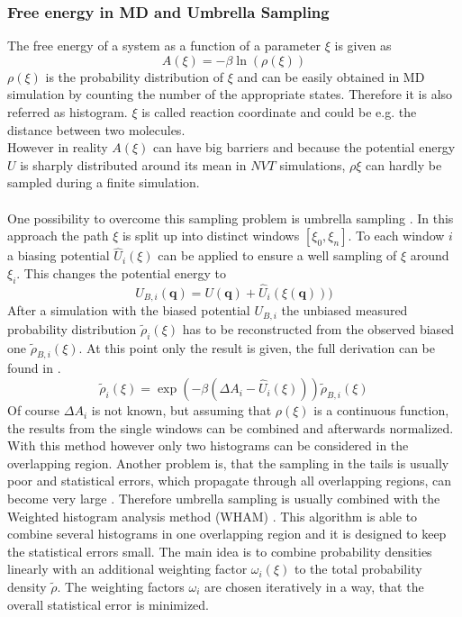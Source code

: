 \subsubsection{Free energy in MD and Umbrella Sampling}
The free energy of a system as a function of a parameter $\xi$ is given as
\begin{equation}
\label{eq:free_energy_from_rho}
A(\xi) = - \beta \ln\left(\rho(\xi)\right)
\end{equation}
$\rho(\xi)$ is the probability distribution of $\xi$ and can be easily obtained in MD simulation by counting the number of the appropriate states. Therefore it is also referred as histogram. $\xi$ is called reaction coordinate and could be e.g. the distance between two molecules.\\
However in reality $A(\xi)$ can have big barriers and because the potential energy $U$ is sharply distributed around its mean in $NVT$ simulations, $\rho{\xi}$ can hardly be sampled during a finite simulation.\\
\\
One possibility to overcome this sampling problem is umbrella sampling \autocite{originalUmbrellaSampling}. In this approach the path $\xi$ is split up into distinct windows $[\xi_0, \xi_n]$. To each window $i$ a biasing potential $\hat{U}_i(\xi)$ can be applied to ensure a well sampling of $\xi$ around $\xi_i$. This changes the potential energy to
\begin{equation}
U_{B, i}(\mathbf{q}) = U(\mathbf{q}) + \hat{U}_i(\xi(\mathbf{q})))
\end{equation}
After a simulation with the biased potential $U_{B, i}$ the unbiased measured probability distribution $\tilde{\rho}_i(\xi)$ has to be reconstructed from the observed biased one $\tilde{\rho}_{B, i}(\xi)$. At this point only the result is given, the full derivation can be found in \textcite[p. 179ff]{UnderstandingMD}.\\
 \begin{equation}
 \label{eq:reconstruction_from_biased}
 \tilde{\rho}_{i}(\xi) = \exp\left(-\beta\left(\Delta A_i - \hat{U}_i(\xi)\right)\right)\tilde{\rho}_{B, i}(\xi)
 \end{equation}
Of course $\Delta A_i$ is not known, but assuming that $\rho(\xi)$ is a continuous function, the results from the single windows can be combined and afterwards normalized.\\
With this method however only two histograms can be considered in the overlapping region. Another problem is, that the sampling in the tails is usually poor and statistical errors, which propagate through all overlapping regions, can become very large \autocite[236ff]{freeEnergyBook}. Therefore umbrella sampling is usually combined with the Weighted histogram analysis method (WHAM) \autocites{originalWHAM, extensionWHAM}. This algorithm is able to combine several histograms in one overlapping region and it is designed to keep the statistical errors small. The main idea is to combine probability densities linearly with an additional weighting factor $\omega_i(\xi)$ to the total probability density $\tilde{\rho}$. The weighting factors $\omega_i$ are chosen iteratively in a way, that the overall statistical error is minimized.\\